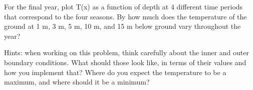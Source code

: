 \documentclass[10pt]{article}
\begin{document}
For the final year, plot T(x) as a function of depth at 4 different time periods that
correspond to the four seasons.  By how much does the temperature of
the ground at 1 m, 3 m, 5 m, 10 m, and 15 m below ground vary throughout
the year?

Hints: when working on this problem, think carefully about the inner and
outer boundary conditions.  What should those look like, in terms of
their values and how you implement that?  Where do you expect the
temperature to be a maximum, and where should it be a minimum?
\end{document}
